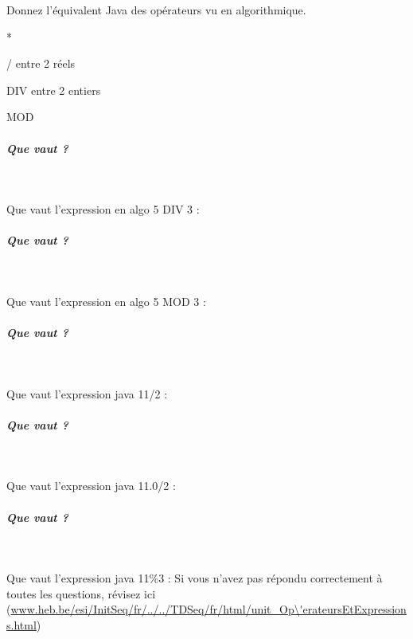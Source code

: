 \documentclass[11pt,a4paper]{article}
\begin{document}
                  Donnez l'\'equivalent Java des op\'erateurs vu en algorithmique.
                
            \par
         
                *   \textcolor{gray}{\underline{\hspace*{1em}}} \par
				
                /   \textcolor{gray}{\underline{\hspace*{1em}}}  entre 2 r\'eels \par
				
                DIV   \textcolor{gray}{\underline{\hspace*{1em}}}  entre 2 entiers \par
				
                MOD   \textcolor{gray}{\underline{\hspace*{1em}}} \par
				
			
		\subparagraph{Que vaut ?} 
		
                \textcolor{white}{.} \par
            Que vaut l'expression en algo
                5 DIV 3 :  \textcolor{gray}{\underline{\hspace*{1em}}} 
			
		\subparagraph{Que vaut ?} 
		
                \textcolor{white}{.} \par
            Que vaut l'expression en algo
                5 MOD 3 :  \textcolor{gray}{\underline{\hspace*{1em}}} 
			
		\subparagraph{Que vaut ?} 
		
                \textcolor{white}{.} \par
            Que vaut l'expression java
                11/2 :  \textcolor{gray}{\underline{\hspace*{1em}}} 
			
		\subparagraph{Que vaut ?} 
		
                \textcolor{white}{.} \par
            Que vaut l'expression java
                11.0/2 :  \textcolor{gray}{\underline{\hspace*{2em}}} 
			
		\subparagraph{Que vaut ?} 
		
                \textcolor{white}{.} \par
            Que vaut l'expression java
                11\%3 :  \textcolor{gray}{\underline{\hspace*{1em}}} Si vous n'avez pas r\'epondu correctement \`a toutes les questions, 
          r\'evisez ici (\url{www.heb.be/esi/InitSeq/fr/../../TDSeq/fr/html/unit\_Op\'erateursEtExpressions.html})
            \par
        
\end{document}
